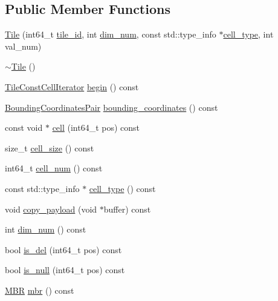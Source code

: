 \subsection*{Public Member Functions}
\begin{DoxyCompactItemize}
\item 
\hyperlink{classTile_a1850e98175b9d67521cd0aad8dedafec}{Tile} (int64\+\_\+t \hyperlink{classTile_a41572d582ec47de8eaff0d6f508bfdb7}{tile\+\_\+id}, int \hyperlink{classTile_abd8d5aa6b388460a0658a24f16615a8c}{dim\+\_\+num}, const std\+::type\+\_\+info $\ast$\hyperlink{classTile_ad325c98f71aac4ab73dc11d27f7b9f8b}{cell\+\_\+type}, int val\+\_\+num)
\item 
\hyperlink{classTile_a98634abbd93fa13d0578d7103202d03d}{$\sim$\+Tile} ()
\item 
\hyperlink{classTileConstCellIterator}{Tile\+Const\+Cell\+Iterator} \hyperlink{classTile_a96ab3e8acca60b15d18828cbdd26e462}{begin} () const 
\item 
\hyperlink{classTile_a7103069b7ba05d1032733e3a026b8632}{Bounding\+Coordinates\+Pair} \hyperlink{classTile_a797e4ed2dca8ac72d7b618bce2c62133}{bounding\+\_\+coordinates} () const 
\item 
const void $\ast$ \hyperlink{classTile_a577f2278ecdbd7a8e402d0a61c303633}{cell} (int64\+\_\+t pos) const 
\item 
size\+\_\+t \hyperlink{classTile_a7d67cde860462c073809cdcc898c4d56}{cell\+\_\+size} () const 
\item 
int64\+\_\+t \hyperlink{classTile_a6cbf05840e8a2c321769e09f6539b154}{cell\+\_\+num} () const 
\item 
const std\+::type\+\_\+info $\ast$ \hyperlink{classTile_ad325c98f71aac4ab73dc11d27f7b9f8b}{cell\+\_\+type} () const 
\item 
void \hyperlink{classTile_ac2462d3c4859cc8d379259cd57827b46}{copy\+\_\+payload} (void $\ast$buffer) const 
\item 
int \hyperlink{classTile_abd8d5aa6b388460a0658a24f16615a8c}{dim\+\_\+num} () const 
\item 
bool \hyperlink{classTile_a184e8ea97adcb37edd4691d64e6f66ae}{is\+\_\+del} (int64\+\_\+t pos) const 
\item 
bool \hyperlink{classTile_a62c1b1461f9da74af27053d4a7076bda}{is\+\_\+null} (int64\+\_\+t pos) const 
\item 
\hyperlink{classTile_a0b0f911c937d339ce110c18a2d015a4d}{M\+B\+R} \hyperlink{classTile_a9cdd79143a4315ae3ace98433738cae6}{mbr} () const 
\item 

\end{DoxyCompactItemize}
